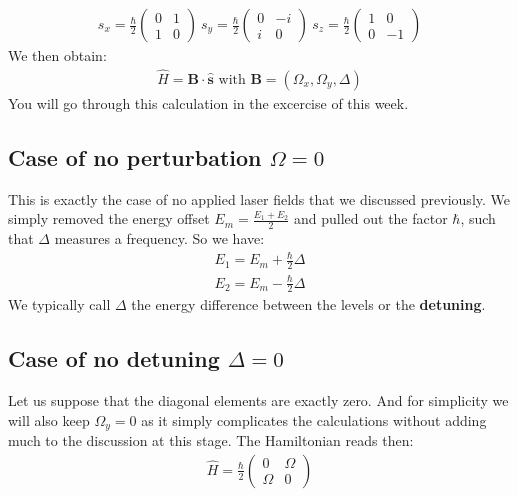 \begin{align}
s_x = \frac{\hbar}{2}\left(\begin{array}{cc}
0 & 1\\
1 &  0
\end{array}
\right)~
s_y = \frac{\hbar}{2}\left(\begin{array}{cc}
0 & -i\\
i &  0
\end{array}
\right)~s_z =\frac{\hbar}{2} \left(\begin{array}{cc}
1 & 0\\
0 &  -1
\end{array}
\right)
\end{align}
We then obtain:
\begin{align}\label{Eq:HamSpin}
\hat{H} = \mathbf{B}\cdot\hat{\mathbf{s}}\text{ with }\mathbf{B} = (\Omega_x, \Omega_y, \Delta)
\end{align}
You will go through this calculation in the excercise of this week.

\subsection{Case of no perturbation $\Omega = 0$}

This is exactly the case of no applied laser fields that we discussed previously. We simply removed the energy offset $E_m = \frac{E_1+E_2}{2}$ and pulled out the factor $\hbar$, such that $\Delta$ measures a frequency. So we have:
\begin{align}
E_1 = E_m+ \frac{\hbar}{2}\Delta\\
E_2 = E_m- \frac{\hbar}{2}\Delta
\end{align}
We typically call $\Delta$ the energy difference between the levels or the \textbf{detuning}.

\subsection{Case of no detuning $\Delta = 0$}

Let us suppose that the diagonal elements are exactly zero. And for simplicity we will also keep $\Omega_y =0$ as it simply complicates the calculations without adding much to the discussion at this stage. The Hamiltonian reads then:
\begin{align}
\hat{H} = \frac{\hbar}{2}\left( \begin{array}{cc} 0  & \Omega\\ \Omega &0 \end{array} \right)
\end{align}

